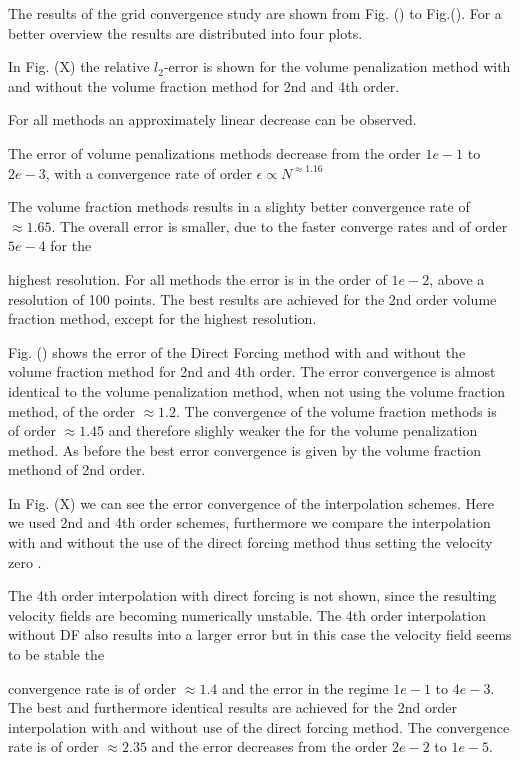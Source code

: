 The results of the grid convergence study are shown from Fig. () to Fig.().
For a better overview the results are distributed into four plots.

In Fig. (X) the relative $l_2$-error is shown for the volume penalization method with and without the volume fraction method
for 2nd and 4th order.

For all methods an approximately linear decrease  can be observed.

The error of volume penalizations methods decrease from the order $1e-1$ to $2e-3$, with
a convergence rate of order  $\epsilon \propto N^{\approx1.16}$

The volume fraction methods results in a slighty better convergence rate of $\approx 1.65$.
The overall error is smaller, due to the faster converge rates and of order $5e-4$ for the

highest resolution. For all methods the error is in the order of $1e-2$, above a resolution of 100 points.
The best results are achieved for the 2nd order volume fraction method, except for the highest resolution.

Fig. () shows the error of the Direct Forcing method with and without the volume fraction method for 2nd
and 4th order. The error convergence is almost identical to the volume penalization method, when not using the volume
fraction method, of the order $\approx 1.2$. The convergence of the volume fraction methods is of order $\approx 1.45$
and therefore slighly weaker the for the volume penalization method.
As before the best error convergence is given by the volume fraction methond of 2nd order.

In Fig. (X) we can see the error convergence of the interpolation schemes.
Here we used 2nd and 4th order schemes, furthermore we compare the interpolation with and without the
use of the direct forcing method thus setting the velocity zero .

The 4th order interpolation with direct forcing is not shown, since the resulting velocity fields are becoming
numerically unstable. The 4th order interpolation without DF also results into a larger error but in this case
the velocity field seems to be stable the

convergence rate is of order $\approx 1.4$ and the error in the regime $1e-1$ to $4e-3$.
The best and furthermore identical results are achieved for the 2nd order interpolation with and without
use of the direct forcing method. The convergence rate is of order $\approx 2.35$ and the error
decreases from the order $2e-2$ to $1e-5$.

